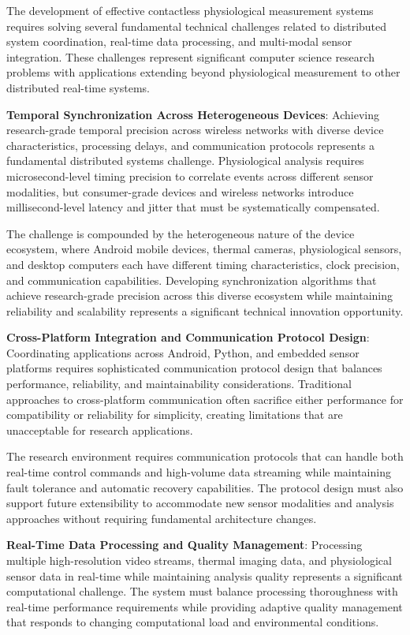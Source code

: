 \documentclass[11pt,a4paper]{report}
\begin{document}
The development of effective contactless physiological measurement systems requires solving several fundamental
technical challenges related to distributed system coordination, real-time data processing, and multi-modal sensor
integration. These challenges represent significant computer science research problems with applications extending
beyond physiological measurement to other distributed real-time systems.

\textbf{Temporal Synchronization Across Heterogeneous Devices}: Achieving research-grade temporal precision across wireless
networks with diverse device characteristics, processing delays, and communication protocols represents a fundamental
distributed systems challenge. Physiological analysis requires microsecond-level timing precision to correlate events
across different sensor modalities, but consumer-grade devices and wireless networks introduce millisecond-level latency
and jitter that must be systematically compensated.

The challenge is compounded by the heterogeneous nature of the device ecosystem, where Android mobile devices, thermal
cameras, physiological sensors, and desktop computers each have different timing characteristics, clock precision, and
communication capabilities. Developing synchronization algorithms that achieve research-grade precision across this
diverse ecosystem while maintaining reliability and scalability represents a significant technical innovation
opportunity.

\textbf{Cross-Platform Integration and Communication Protocol Design}: Coordinating applications across Android, Python, and
embedded sensor platforms requires sophisticated communication protocol design that balances performance, reliability,
and maintainability considerations. Traditional approaches to cross-platform communication often sacrifice either
performance for compatibility or reliability for simplicity, creating limitations that are unacceptable for research
applications.

The research environment requires communication protocols that can handle both real-time control commands and
high-volume data streaming while maintaining fault tolerance and automatic recovery capabilities. The protocol design
must also support future extensibility to accommodate new sensor modalities and analysis approaches without requiring
fundamental architecture changes.

\textbf{Real-Time Data Processing and Quality Management}: Processing multiple high-resolution video streams, thermal imaging
data, and physiological sensor data in real-time while maintaining analysis quality represents a significant
computational challenge. The system must balance processing thoroughness with real-time performance requirements while
providing adaptive quality management that responds to changing computational load and environmental conditions.
\end{document}
